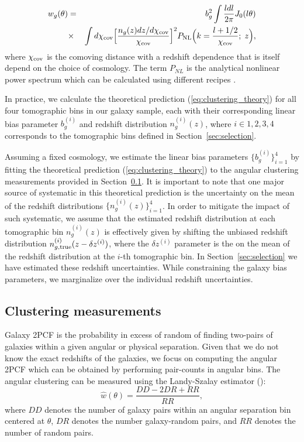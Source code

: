 \documentclass[fleqn,usenatbib,useAMS]{mnras}
\begin{document}
\begin{eqnarray}
w_{g}(\theta) &=& b_g^2 \int \frac{l dl}{2\pi}J_{0}(l\theta)  \nonumber \\ 
            &\times& \int d\chi_{\rm cov} \Big[\frac{n_{g}(z)dz/d\chi_{\rm cov}}{\chi_{\rm cov}}\Big]^{2}P_{\rm NL}\Big(k = \frac{l+1/2}{\chi_{\rm cov}}; \; z\Big),                  
\label{eq:clustering_theory}
\end{eqnarray}
where $\chi_{\rm cov}$ is the comoving distance with a redshift dependence that is itself depend on the choice of cosmology. The term $P_{NL}$ is the analytical nonlinear power spectrum which can be calculated using different recipes  \citep[e.g. ][]{takahashi2012, emu2014,mead2015, smith2019}.

In practice, we calculate the theoretical prediction (\ref{eq:clustering_theory}) for all four tomographic bins in our galaxy sample, each with their corresponding linear bias parameter $b^{(i)}_{g}$ and redshift distribution $n^{(i)}_{g}(z)$, where $i\in {1,2,3,4}$ corresponds to the tomographic bins defined in Section~\ref{sec:selection}.

Assuming a fixed cosmology, we estimate the linear bias parameters $\{b^{(i)}_{g}\}_{i=1}^{4}$ by fitting the theoretical prediction (\ref{eq:clustering_theory}) to the angular clustering measurements provided in Section~\ref{sec:measurement}. It is important to note that one major source of systematic in this theoretical prediction is the uncertainty on the mean of the redshift distributions $\{n_{g}^{(i)}(z)\}_{i=1}^{4}$. In order to mitigate the impact of such systematic, we assume that the estimated redshift distribution at each tomographic bin $n_{g}^{(i)}(z)$ is effectively given by shifting the unbiased redshift distribution $n_{g, \rm true}^{(i)}(z - \delta z^{(i)})$, where the $\delta z^{(i)}$ parameter is the on the mean of the redshift distribution at the $i$-th tomographic bin. In Section~\ref{sec:selection} we have estimated these redshift uncertainties. While constraining the galaxy bias parameters, we marginalize over the individual redshift uncertainties. 

\subsection{Clustering measurements}\label{sec:measurement}

Galaxy 2PCF is the probability in excess of random of finding two-pairs of galaxies within a given angular or physical separation. Given that we do not know the exact redshifts of the galaxies, we focus on computing the angular 2PCF which can be obtained by performing pair-counts in angular bins. The angular clustering can be measured using the Landy-Szalay estimator (\citealt{landy}):
\begin{equation}
    \hat{w}(\theta) = \frac{DD-2DR+RR}{RR},
\label{eq:landy}
\end{equation}
where $DD$ denotes the number of galaxy pairs within an angular separation bin centered at $\theta$, $DR$ denotes the number galaxy-random pairs, and $RR$ denotes the number of random pairs. 
\end{document}
